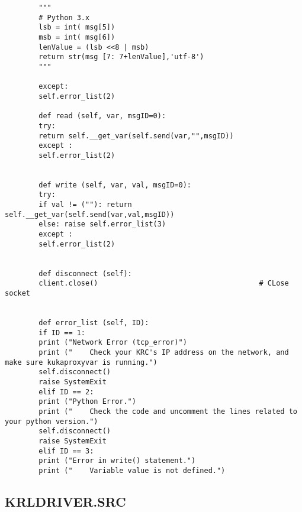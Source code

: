 \documentclass{book}
\begin{document}
\begin{verbatim}
		"""
		# Python 3.x
		lsb = int( msg[5])
		msb = int( msg[6])
		lenValue = (lsb <<8 | msb)
		return str(msg [7: 7+lenValue],'utf-8')  
		"""
		
		except:
		self.error_list(2)
		
		def read (self, var, msgID=0):
		try:
		return self.__get_var(self.send(var,"",msgID))  
		except :
		self.error_list(2)
		
		
		def write (self, var, val, msgID=0):
		try:
		if val != (""): return self.__get_var(self.send(var,val,msgID))
		else: raise self.error_list(3)
		except :
		self.error_list(2)
		
		
		def disconnect (self):
		client.close()                                      # CLose socket
		
		
		def error_list (self, ID):
		if ID == 1:
		print ("Network Error (tcp_error)")
		print ("    Check your KRC's IP address on the network, and make sure kukaproxyvar is running.")
		self.disconnect()
		raise SystemExit
		elif ID == 2:
		print ("Python Error.")
		print ("    Check the code and uncomment the lines related to your python version.")
		self.disconnect()
		raise SystemExit
		elif ID == 3:
		print ("Error in write() statement.")
		print ("    Variable value is not defined.")
	\end{verbatim}


	\newpage
	\subsection{KRLDRIVER.SRC}
	
\end{document}
